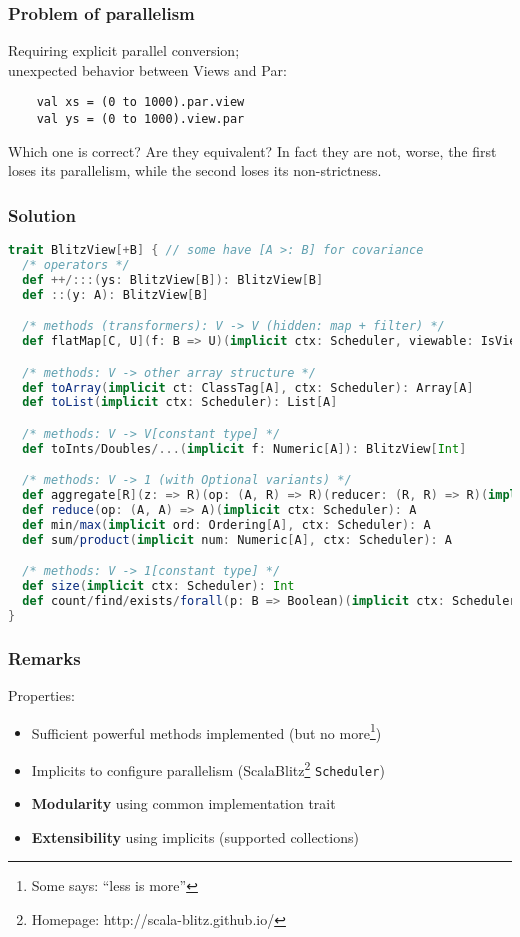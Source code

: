 \documentclass[12pt]{beamer}
\begin{document}
\begin{frame}[fragile]
    \frametitle{Problem of parallelism}
    Requiring explicit parallel conversion; \\
    unexpected behavior between Views and Par:\\

    \begin{lstlisting}
    val xs = (0 to 1000).par.view
    val ys = (0 to 1000).view.par
    \end{lstlisting}

    Which one is correct? Are they equivalent? In fact they are not, worse, the first loses its parallelism, while the second loses its non-strictness.
\end{frame}

\begin{frame}[fragile]
    \frametitle{Solution}
    \begin{lstlisting}[language=scala, basicstyle=\tiny]
trait BlitzView[+B] { // some have [A >: B] for covariance
  /* operators */
  def ++/:::(ys: BlitzView[B]): BlitzView[B]
  def ::(y: A): BlitzView[B]

  /* methods (transformers): V -> V (hidden: map + filter) */
  def flatMap[C, U](f: B => U)(implicit ctx: Scheduler, viewable: IsViewable[U, C]): BlitzView[C]

  /* methods: V -> other array structure */
  def toArray(implicit ct: ClassTag[A], ctx: Scheduler): Array[A]
  def toList(implicit ctx: Scheduler): List[A]

  /* methods: V -> V[constant type] */
  def toInts/Doubles/...(implicit f: Numeric[A]): BlitzView[Int]

  /* methods: V -> 1 (with Optional variants) */
  def aggregate[R](z: => R)(op: (A, R) => R)(reducer: (R, R) => R)(implicit ctx: Scheduler): R
  def reduce(op: (A, A) => A)(implicit ctx: Scheduler): A
  def min/max(implicit ord: Ordering[A], ctx: Scheduler): A
  def sum/product(implicit num: Numeric[A], ctx: Scheduler): A

  /* methods: V -> 1[constant type] */
  def size(implicit ctx: Scheduler): Int
  def count/find/exists/forall(p: B => Boolean)(implicit ctx: Scheduler): Int
}
    \end{lstlisting}
\end{frame}

\begin{frame}
    \frametitle{Remarks}
    Properties:
    \begin{itemize}
        \item Sufficient powerful methods implemented (but no more\footnote{Some says: ``less is more''})
        \item Implicits to configure parallelism (ScalaBlitz\footnote{Homepage: http://scala-blitz.github.io/} {\tt Scheduler})
        \item {\bf Modularity} using common implementation trait
        \item {\bf Extensibility} using implicits (supported collections)
    \end{itemize}
\end{frame}
\end{document}
